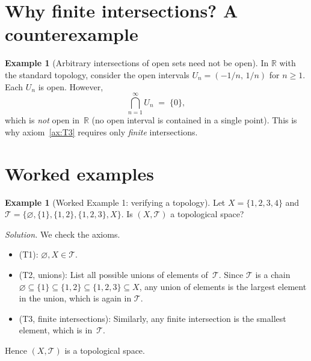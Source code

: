 \documentclass[11pt,a4paper,twoside]{book}
\theoremstyle{remark}
\theoremstyle{definition}
\newtheorem{exampleplain}[theorem]{Example}
\theoremstyle{definition}
\newcommand{\Tau}{\mathcal{T}}           %
\newcommand{\R}{\mathbb{R}}
\begin{document}
\section{Why finite intersections?  A counterexample}
\label{sec:counterexample-infinite-intersection}

\begin{exampleplain}[Arbitrary intersections of open sets need not be open]
\label{ex:infinite-intersection-not-open}
In $\R$ with the standard topology, consider the open intervals
$U_n=(-1/n,\,1/n)$ for $n\geq 1$.  Each $U_n$ is open.  However,
\[
  \bigcap_{n=1}^{\infty}U_n \;=\; \{0\},
\]
which is \emph{not} open in~$\R$ (no open interval is contained in a single
point).  This is why axiom~\ref{ax:T3} requires only \emph{finite}
intersections.
\end{exampleplain}

\begin{center}
\end{center}


\section{Worked examples}
\label{sec:worked-examples-ch1}

\begin{exampleplain}[Worked Example 1: verifying a topology]
\label{ex:worked1}
Let $X=\{1,2,3,4\}$ and $\Tau=\{\varnothing,\{1\},\{1,2\},\{1,2,3\},X\}$.
Is $(X,\Tau)$ a topological space?

\emph{Solution.}  We check the axioms.
\begin{itemize}
  \item (T1): $\varnothing,X\in\Tau$. \checkmark
  \item (T2, unions): List all possible unions of elements of~$\Tau$.  Since
        $\Tau$ is a chain $\varnothing\subseteq\{1\}\subseteq\{1,2\}
        \subseteq\{1,2,3\}\subseteq X$, any union of elements is the largest
        element in the union, which is again in $\Tau$. \checkmark
  \item (T3, finite intersections): Similarly, any finite intersection is the
        smallest element, which is in~$\Tau$. \checkmark
\end{itemize}
Hence $(X,\Tau)$ is a topological space.
\end{exampleplain}
\end{document}

